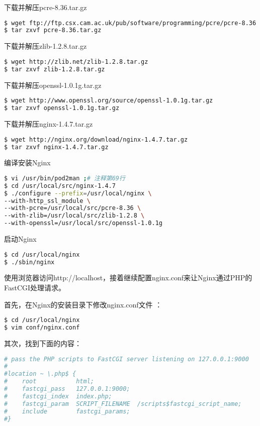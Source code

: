 下载并解压pcre-8.36.tar.gz

\begin{lstlisting}[language=bash]
$ wget ftp://ftp.csx.cam.ac.uk/pub/software/programming/pcre/pcre-8.36.tar.gz
$ tar zxvf pcre-8.36.tar.gz
\end{lstlisting}


下载并解压zlib-1.2.8.tar.gz


\begin{lstlisting}[language=bash]
$ wget http://zlib.net/zlib-1.2.8.tar.gz
$ tar zxvf zlib-1.2.8.tar.gz
\end{lstlisting}

下载并解压openssl-1.0.1g.tar.gz


\begin{lstlisting}[language=bash]
$ wget http://www.openssl.org/source/openssl-1.0.1g.tar.gz
$ tar zxvf openssl-1.0.1g.tar.gz
\end{lstlisting}

下载并解压nginx-1.4.7.tar.gz


\begin{lstlisting}[language=bash]
$ wget http://nginx.org/download/nginx-1.4.7.tar.gz
$ tar zxvf nginx-1.4.7.tar.gz
\end{lstlisting}


编译安装Nginx


\begin{lstlisting}[language=bash]
$ vi /usr/bin/pod2man ;# 注释第69行
$ cd /usr/local/src/nginx-1.4.7
$ ./configure --prefix=/usr/local/nginx \
--with-http_ssl_module \
--with-pcre=/usr/local/src/pcre-8.36 \
--with-zlib=/usr/local/src/zlib-1.2.8 \
--with-openssl=/usr/local/src/openssl-1.0.1g
\end{lstlisting}

启动Nginx

\begin{lstlisting}[language=bash]
$ cd /usr/local/nginx
$ ./sbin/nginx
\end{lstlisting}

使用浏览器访问http://localhost，接着继续配置nginx.conf来让Nginx通过PHP的FastCGI处理请求。

首先，在Nginx的安装目录下修改nginx.conf文件	：


\begin{lstlisting}[language=bash]
$ cd /usr/local/nginx
$ vim conf/nginx.conf
\end{lstlisting}

其次，找到下面的内容：


\begin{lstlisting}[language=bash]
# pass the PHP scripts to FastCGI server listening on 127.0.0.1:9000
#
#location ~ \.php$ {
#    root           html;
#    fastcgi_pass   127.0.0.1:9000;
#    fastcgi_index  index.php;
#    fastcgi_param  SCRIPT_FILENAME  /scripts$fastcgi_script_name;
#    include        fastcgi_params;
#}
\end{lstlisting}


